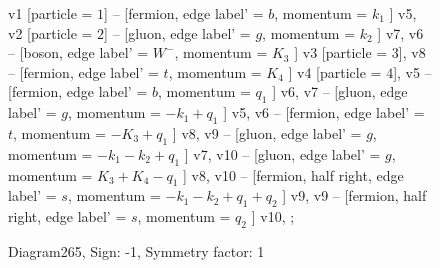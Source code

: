 \documentclass{revtex4}
\begin{document}
\begin{figure}[!htb]
\begin{center}
{    %
v1 [particle = \(1\)] -- [fermion, edge label' = \(b\), momentum = \(k_{1}\) ] v5, 
v2 [particle = \(2\)] -- [gluon, edge label' = \(g\), momentum = \(k_{2}\) ] v7, 
v6 -- [boson, edge label' = \(W^{-}\), momentum = \(K_{3}\) ] v3 [particle = \(3\)], 
v8 -- [fermion, edge label' = \(t\), momentum = \(K_{4}\) ] v4 [particle = \(4\)], 
v5 -- [fermion, edge label' = \(b\), momentum = \(q_{1}\) ] v6, 
v7 -- [gluon, edge label' = \(g\), momentum = \(-k_{1} + q_{1}\) ] v5, 
v6 -- [fermion, edge label' = \(t\), momentum = \(-K_{3} + q_{1}\) ] v8, 
v9 -- [gluon, edge label' = \(g\), momentum = \(-k_{1} - k_{2} + q_{1}\) ] v7, 
v10 -- [gluon, edge label' = \(g\), momentum = \(K_{3} + K_{4} - q_{1}\) ] v8, 
v10 -- [fermion, half right, edge label' = \(s\), momentum = \(-k_{1} - k_{2} + q_{1} + q_{2}\) ] v9, 
v9 -- [fermion, half right, edge label' = \(s\), momentum = \(q_{2}\) ] v10, 
};
\end{center}
\caption{Diagram265, Sign: -1, Symmetry factor: 1}
\end{figure}
\newpage
\end{document}
